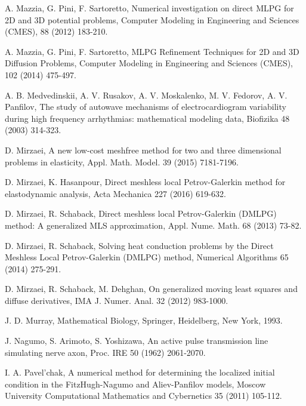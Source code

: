 \documentclass[12pt]{article}
\numberwithin{equation}{section}
\begin{document}
\begin{thebibliography}{99}
 A. Mazzia, G. Pini, F. Sartoretto, Numerical investigation on direct MLPG for
2D and 3D potential problems, Computer Modeling in Engineering and Sciences (CMES), 88 (2012) 183-210.

 A. Mazzia, G. Pini, F. Sartoretto, MLPG Refinement Techniques for 2D and 3D Diffusion Problems, Computer Modeling in Engineering 
and Sciences (CMES), 102 (2014) 475-497.

 A. B. Medvedinskii, A. V. Rusakov, A. V. Moskalenko, M. V. Fedorov, A. V. Panfilov, The study of autowave mechanisms of electrocardiogram variability during high frequency arrhythmias: mathematical modeling data, Biofizika 48 (2003) 314-323.

 D. Mirzaei, A new low-cost meshfree method for two and three
dimensional problems in elasticity, Appl. Math. Model. 39 (2015) 7181-7196.

 D. Mirzaei, K. Hasanpour, Direct meshless local Petrov-Galerkin method for elastodynamic analysis, 
Acta Mechanica 227 (2016) 619-632.


  D. Mirzaei, R. Schaback, Direct meshless local Petrov-Galerkin (DMLPG) method: A generalized
MLS approximation, Appl. Nume. Math. 68 (2013)  73-82.

 D. Mirzaei, R. Schaback, Solving heat conduction problems by the Direct Meshless Local
Petrov-Galerkin (DMLPG) method, Numerical Algorithms  65 (2014) 275-291.

 D. Mirzaei, R. Schaback, M. Dehghan, On generalized moving least squares and diffuse
derivatives, IMA J. Numer. Anal. 32 (2012) 983-1000.

 J. D. Murray, Mathematical Biology, Springer, Heidelberg, New York, 1993.

 J. Nagumo, S. Arimoto, S. Yoshizawa, An active pulse transmission line simulating nerve axon, Proc. IRE 50 (1962) 2061-2070.

 I. A. Pavel'chak, A numerical method for determining the localized initial condition in the
FitzHugh-Nagumo and Aliev-Panfilov models, Moscow University Computational Mathematics
and Cybernetics 35 (2011) 105-112.


\end{thebibliography}
\end{document}
